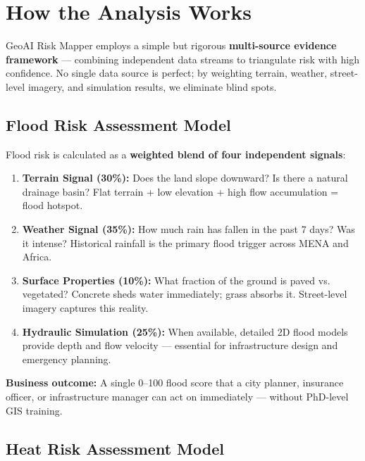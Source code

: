\documentclass[11pt, a4paper]{article}
\begin{document}
\section{How the Analysis Works}

GeoAI Risk Mapper employs a simple but rigorous \textbf{multi-source evidence framework}
— combining independent data streams to triangulate risk with high confidence. No single data source is perfect;
by weighting terrain, weather, street-level imagery, and simulation results, we eliminate blind spots.

\subsection*{Flood Risk Assessment Model}

Flood risk is calculated as a \textbf{weighted blend of four independent signals}:

\begin{enumerate}[label=\arabic*., leftmargin=1.5em, itemsep=4pt]
  \item \textbf{Terrain Signal (30\%):} Does the land slope downward? Is there a natural drainage basin? 
    Flat terrain + low elevation + high flow accumulation = flood hotspot.
  
  \item \textbf{Weather Signal (35\%):} How much rain has fallen in the past 7 days? Was it intense?
    Historical rainfall is the primary flood trigger across MENA and Africa.
  
  \item \textbf{Surface Properties (10\%):} What fraction of the ground is paved vs. vegetated?
    Concrete sheds water immediately; grass absorbs it. Street-level imagery captures this reality.
  
  \item \textbf{Hydraulic Simulation (25\%):} When available, detailed 2D flood models provide
    depth and flow velocity — essential for infrastructure design and emergency planning.
\end{enumerate}

\textbf{Business outcome:} A single 0–100 flood score that a city planner, insurance officer, or
infrastructure manager can act on immediately — without PhD-level GIS training.

\subsection*{Heat Risk Assessment Model}
\end{document}
